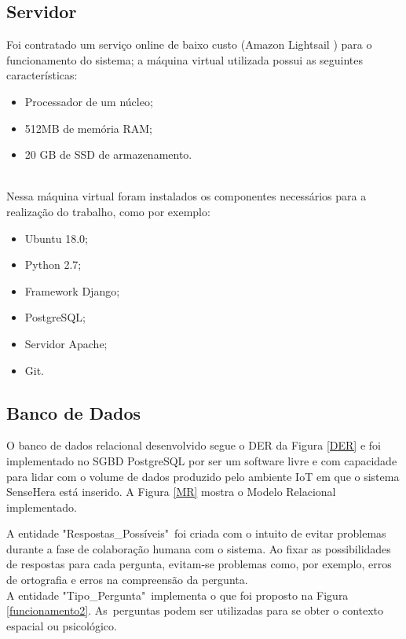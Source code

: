 \subsection{Servidor}
\nul \quad Foi contratado um serviço online de baixo custo (Amazon Lightsail \cite{lightsail}) para o funcionamento do sistema; a máquina virtual utilizada possui as seguintes características:
\begin{itemize}
  \item Processador de um núcleo;
  \item 512MB de memória RAM;
  \item 20 GB de SSD de armazenamento.
\end{itemize}
\\\null \quad Nessa máquina virtual foram instalados os componentes necessários para a realização do trabalho, como por exemplo:
\begin{itemize}
  \item Ubuntu 18.0;
  \item Python 2.7;
  \item Framework Django;
  \item PostgreSQL;
  \item Servidor Apache;
  \item Git.
\end{itemize}

\subsection{Banco de Dados}
\null \quad O banco de dados relacional desenvolvido segue o \acrfull{DER} da Figura \ref{DER} e foi implementado no \acrfull{SGBD} PostgreSQL por ser um software livre e com capacidade para lidar com o volume de dados produzido pelo ambiente \acrshort{IoT} em que o sistema SenseHera está inserido. A Figura \ref{MR} mostra o Modelo Relacional implementado.

\newpage
{}
A entidade "Respostas\_Possíveis"\ foi criada com o intuito de evitar problemas durante a fase de colaboração humana com o sistema. Ao fixar as possibilidades de respostas para cada pergunta, evitam-se problemas como, por exemplo, erros de ortografia e erros na compreensão da pergunta.
\\\null \quad A entidade "Tipo\_Pergunta"\ implementa o que foi proposto na Figura \ref{funcionamento2}. As\ perguntas podem ser utilizadas para se obter o contexto espacial ou psicológico.
